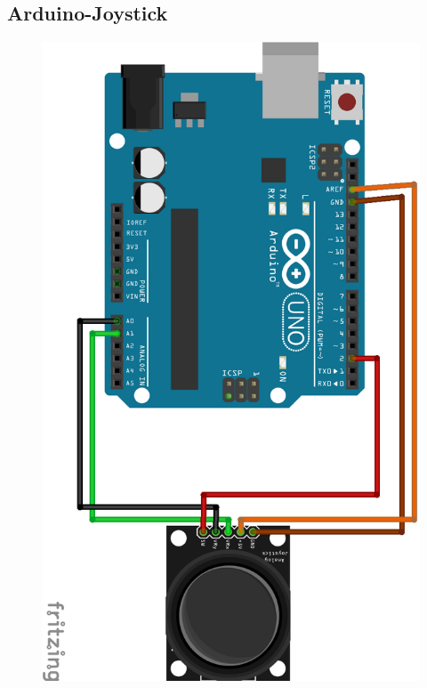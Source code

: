 \documentclass[12pt,notitlepage]{article}
\begin{document}
\subsection{Arduino-Joystick}
\begin{figure}[h!]
   \includegraphics[height=0.9\textheight]{schemat_plytka-joystick.png}
   \centering
  \label{fig:schemat-plytka-joystick}
\end{figure}
\end{document}
